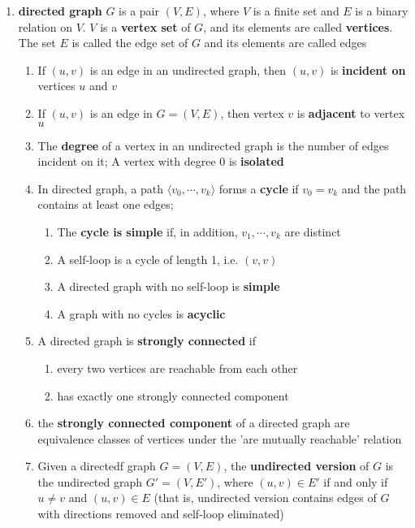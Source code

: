 \documentclass[11pt]{article}
\begin{document}
\begin{defn*}
    $ $\\
    \begin{enumerate}
        \item \textbf{directed graph} $G$ is a pair $(V, E)$, where $V$ is a finite set and $E$ is a binary relation on $V$. $V$ is a \textbf{vertex set} of $G$, and its elements are called \textbf{vertices}. The set $E$ is called the edge set of $G$ and its elements are called edges
        \begin{enumerate}
            \item If $(u,v)$ is an edge in an undirected graph, then $(u, v)$ is \textbf{incident on} vertices $u$ and $v$
            \item If $(u,v)$ is an edge in $G = (V,E)$, then vertex $v$ is \textbf{adjacent} to vertex $u$
            \item The \textbf{degree} of a vertex in an undirected graph is the number of edges incident on it; A vertex with degree 0 is \textbf{isolated}
            \item In directed graph, a path $\langle v_0, \cdots, v_k \rangle$ forms a \textbf{cycle} if $v_0 = v_k$ and the path contains at least one edges; 
            \begin{enumerate}
                \item The \textbf{cycle is simple} if, in addition, $v_1, \cdots, v_k$ are distinct
                \item A self-loop is a cycle of length 1, i.e. $(v, v)$
                \item A directed graph with no self-loop is \textbf{simple}
                \item A graph with no cycles is \textbf{acyclic}
            \end{enumerate}
            \item A directed graph is \textbf{strongly connected} if 
            \begin{enumerate}
                \item every two vertices are reachable from each other 
                \item has exactly one strongly connected component
            \end{enumerate}
            \item the \textbf{strongly connected component} of a directed graph are equivalence classes of vertices under the 'are mutually reachable' relation
            \item Given a directedf graph $G =  (V, E)$, the \textbf{undirected version} of $G$ is the undirected graph $G' = (V,E')$, where $(u,v) \in E'$ if and only if $u\neq v$ and $(u,v)\in E$ (that is, undirected version contains edges of $G$ with directions removed and self-loop eliminated)

\end{enumerate}
\end{enumerate}
\end{defn*}
\end{document}
